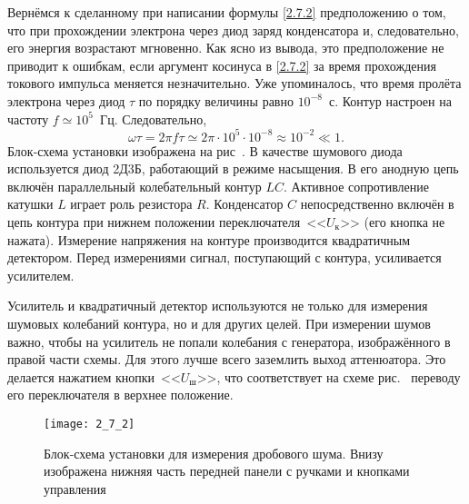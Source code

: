 Вернёмся к сделанному при написании формулы \eqref{2.7.2} предположению о том, что при прохождении электрона через диод заряд
конденсатора и, следовательно, его энергия возрастают мгновенно. Как ясно из вывода, это предположение не приводит к
ошибкам, если аргумент косинуса в \eqref{2.7.2} за время прохождения токового импульса меняется незначительно. Уже
упоминалось, что время пролёта электрона через диод $\tau$ по порядку величины равно $10^{-8}$~с. Контур настроен на
частоту $f\simeq10^5$~Гц. Следовательно,
\begin{equation*}
\omega\tau=2\pi f\tau\simeq2\pi\cdot 10^5\cdot 10^{-8}\approx10^{-2}\ll1.
\end{equation*}
\experiment
Блок-схема установки изображена на рис~. В качестве шумового диода используется диод 2Д3Б, работающий в
режиме насыщения. В его анодную цепь включён параллельный колебательный контур $LC$. Активное сопротивление катушки $L$
играет роль резистора $R$. Конденсатор $C$ непосредственно включён в цепь контура при нижнем положении
переключателя~<<$U_{\text{к}}$>> (его кнопка не нажата). Измерение напряжения на контуре производится квадратичным детектором.
Перед измерениями сигнал, поступающий с контура, усиливается усилителем.

Усилитель и квадратичный детектор используются не только для измерения шумовых колебаний контура, но и для других целей.
При измерении шумов важно, чтобы на усилитель не попали колебания с генератора, изображённого в правой части схемы. Для
этого лучше всего заземлить выход аттенюатора. Это делается нажатием кнопки~<<$U_{\text{ш}}$>>, что соответствует на схеме
рис.~ переводу его переключателя в верхнее положение.

\begin{figure}[h!]
	\texttt{[image: 2\_7\_2]}
	\caption{Блок-схема установки для измерения дробового шума. Внизу изображена нижняя часть передней панели с ручками и кнопками управления}
\end{figure}

